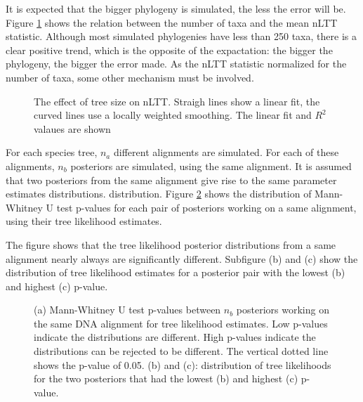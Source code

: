 It is expected that the bigger phylogeny is simulated, the less the error
will be. Figure \ref{fig:figure_error_tree_size} shows the relation between the
number of taxa and the mean nLTT statistic. Although most simulated
phylogenies have less than 250 taxa, there is a clear positive trend, 
which is the opposite of the
expactation: the bigger the phylogeny, the bigger the error made.
As the nLTT statistic normalized for the number of taxa, some other
mechanism must be involved. 

\begin{figure}[!htbp]
  \caption{
    The effect of tree size on nLTT.
    Straigh lines show a linear
    fit, the curved lines use a locally weighted smoothing.
    The linear fit and $R^2$ valaues are shown
  }
  \label{fig:figure_error_tree_size}
\end{figure}

For each species tree, $n_a$ different alignments are simulated. For each of
these alignments, $n_b$ posteriors are simulated, using the same alignment. 
It is assumed that two posteriors from the same alignment
give rise to the same parameter estimates distributions.
distribution. Figure \ref{fig:figure_posterior_distributions_likelihood} 
shows the distribution of Mann-Whitney U test p-values for each pair of 
posteriors working on a same alignment, 
using their tree likelihood estimates.

The figure shows that the tree likelihood posterior distributions 
from a same alignment nearly always
are significantly different. Subfigure (b) and (c) show the distribution of
tree likelihood estimates for a posterior pair with the lowest (b) and 
highest (c) p-value.

\begin{figure}[!htbp]
  \caption{
    (a) Mann-Whitney U test p-values between $n_b$ posteriors working on the same DNA alignment
    for tree likelihood estimates.
    Low p-values indicate the distributions are different.
    High p-values indicate the distributions can be rejected to be different.
    The vertical dotted line shows the p-value of 0.05.
    (b) and (c): distribution of tree likelihoods for the two posteriors that had the lowest
    (b) and highest (c) p-value.
  }
  \label{fig:figure_posterior_distributions_likelihood}
\end{figure}

